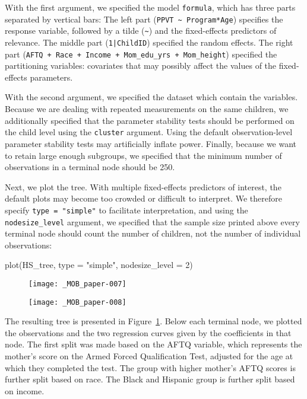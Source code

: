 \documentclass[doc,floatsintext,natbib]{apa7}
\begin{document}
With the first argument, we specified the model \verb|formula|, which has three parts separated by vertical bars: The left part (\verb|PPVT ~ Program*Age|) specifies the response variable, followed by a tilde (\verb|~|) and the fixed-effects predictors of relevance. The middle part (\texttt{1|ChildID}) specified the random effects. The right part (\verb|AFTQ + Race + Income + Mom_edu_yrs + Mom_height|) specified the partitioning variables: covariates that may possibly affect the values of the fixed-effects parameters. 

With the second argument, we specified the dataset which contain the variables. Because we are dealing with repeated measurements on the same children, we additionally specified that the parameter stability tests should be performed on the child level using the \verb|cluster| argument. Using the default observation-level parameter stability tests may artificially inflate power. Finally, because we want to retain large enough subgroups, we specified that the minimum number of observations in a terminal node should be 250.

Next, we plot the tree. With multiple fixed-effects predictors of interest, the default plots may become too crowded or difficult to interpret. We therefore specify \verb|type = "simple"| to facilitate interpretation, and using the \verb|nodesize_level| argument, we specified that the sample size printed above every terminal node should count the number of children, not the number of individual observations:

\begin{Schunk}
\begin{Sinput}
 plot(HS_tree, type = "simple", nodesize_level = 2)
\end{Sinput}
\end{Schunk}

\begin{figure}%
\caption{}
\texttt{[image: \_MOB\_paper-007]}

\vspace*{-3cm}

\texttt{[image: \_MOB\_paper-008]}
\label{fig:lmm_tree}
\end{figure}%

The resulting tree is presented in Figure~\ref{fig:lmm_tree}. Below each terminal node, we plotted the observations and the two regression curves given by the coefficients in that node. The first split was made based on the AFTQ variable, which represents the mother's score on the Armed Forced Qualification Test, adjusted for the age at which they completed the test. The group with higher mother's AFTQ scores is further split based on race. The Black and Hispanic group is further split based on income. 
\end{document}
